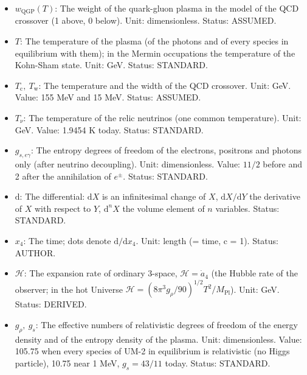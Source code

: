 \documentclass[
  10pt,
]{article}
\providecommand{\tightlist}{%
  \setlength{\itemsep}{0pt}\setlength{\parskip}{0pt}}
\begin{document}
\begin{itemize}
\tightlist
\item
  \(w_{\mathrm{QGP}}(T)\): The weight of the quark-gluon plasma in the
  model of the QCD crossover (1 above, 0 below). Unit: dimensionless.
  Status: ASSUMED.
\item
  \(T\): The temperature of the plasma (of the photons and of every
  species in equilibrium with them); in the Mermin occupations the
  temperature of the Kohn-Sham state. Unit: GeV. Status: STANDARD.
\item
  \(T_{\mathrm{c}},\ T_{\mathrm{w}}\): The temperature and the width of
  the QCD crossover. Unit: GeV. Value: 155 MeV and 15 MeV. Status:
  ASSUMED.
\item
  \(T_\nu\): The temperature of the relic neutrinos (one common
  temperature). Unit: GeV. Value: 1.9454 K today. Status: STANDARD.
\item
  \(g_{s,e\gamma}\): The entropy degrees of freedom of the electrons,
  positrons and photons only (after neutrino decoupling). Unit:
  dimensionless. Value: \(11/2\) before and 2 after the annihilation of
  \(e^\pm\). Status: STANDARD.
\item
  \(\mathrm{d}\): The differential: \(\mathrm{d}X\) is an infinitesimal
  change of \(X\), \(\mathrm{d}X/\mathrm{d}Y\) the derivative of \(X\)
  with respect to \(Y\), \(\mathrm{d}^nX\) the volume element of \(n\)
  variables. Status: STANDARD.
\item
  \(x_4\): The time; dots denote \(\mathrm{d}/\mathrm{d}x_4\). Unit:
  length (= time, c = 1). Status: AUTHOR.
\item
  \(\mathcal{H}\): The expansion rate of ordinary 3-space,
  \(\mathcal{H} = \dot a_4\) (the Hubble rate of the observer; in the
  hot Universe
  \(\mathcal{H} = (8\pi^3g_\rho/90)^{1/2}T^2/M_{\mathrm{Pl}}\)). Unit:
  GeV. Status: DERIVED.
\item
  \(g_\rho,\ g_s\): The effective numbers of relativistic degrees of
  freedom of the energy density and of the entropy density of the
  plasma. Unit: dimensionless. Value: 105.75 when every species of UM-2
  in equilibrium is relativistic (no Higgs particle), 10.75 near 1 MeV,
  \(g_s = 43/11\) today. Status: STANDARD.
\end{itemize}
\end{document}
